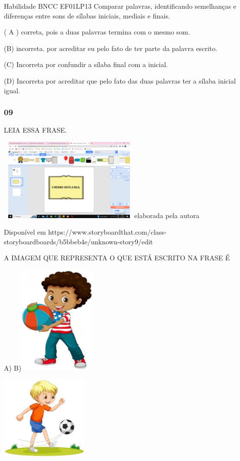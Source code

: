 \begin{escola}
Habilidade BNCC EF01LP13 Comparar palavras, identificando semelhanças e
diferenças entre sons de sílabas iniciais, mediais e finais.

( A ) correta, pois a duas palavras termina com o mesmo som.

(B) incorreta. por acreditar eu pelo fato de ter parte da palavra
escrito.

(C) Incorreta por confundir a sílaba final com a inicial.

(D) Incorreta por acreditar que pelo fato das duas palavras ter a sílaba
inicial igual.

\subsubsection{09}\label{section-34}

LEIA ESSA FRASE.

\includegraphics[width=2.80293in,height=1.64007in]{media/image198.png}elaborada
pela autora

Disponível em
https://www.storyboardthat.com/class-storyboardboards/b5bbeb4e/unknown-story9/edit

A IMAGEM QUE REPRESENTA O QUE ESTÁ ESCRITO NA FRASE É

A)
B)\includegraphics[width=1.53194in,height=2.16250in]{media/image199.jpg}

\includegraphics[width=1.73760in,height=1.66822in]{media/image200.jpg}


\end{escola}
